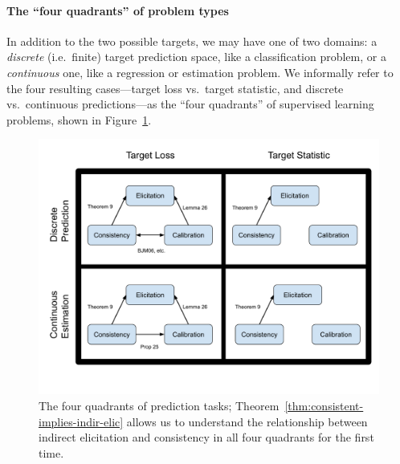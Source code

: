 \documentclass[anon,12pt]{colt2021} %
\begin{document}
\paragraph{The ``four quadrants'' of problem types}
In addition to the two possible targets, we may have one of two domains: a \emph{discrete} (i.e.\ finite) target prediction space, like a classification problem, or a \emph{continuous} one, like a regression or estimation problem.
We informally refer to the four resulting cases---target loss vs.\ target statistic, and discrete vs.\ continuous predictions---as the ``four quadrants'' of supervised learning problems, shown in Figure~\ref{fig:four-quadrants}.

\begin{figure}
	\begin{minipage}{0.25\linewidth}
	\caption{The four quadrants of prediction tasks; Theorem~\ref{thm:consistent-implies-indir-elic} allows us to understand the relationship between indirect elicitation and consistency in all four quadrants for the first time.}\label{fig:four-quadrants}	
	\end{minipage}
	\hfill
	\begin{minipage}{0.72\linewidth}
	\centering
	\includegraphics[width=0.95\linewidth]{tikz/consistency-elicitation-calibration.pdf}
	\end{minipage}
\end{figure}
\end{document}

